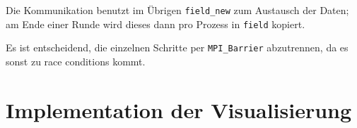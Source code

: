\begin{Shaded}
\begin{Highlighting}[]
            \NormalTok{blocklengths[}\NormalTok{] = \{}\NormalTok{,}\NormalTok{,}\NormalTok{,}\NormalTok{,}\NormalTok{\};                                  \textbackslash{}}
  \NormalTok{MPI_Datatype types[}\NormalTok{] = \{MPI_INT,MPI_INT,MPI_INT, MPI_INT, MPI_INT\};               \textbackslash{}}
  \NormalTok{MPI_Aint     offsets[}\NormalTok{];                                                   \textbackslash{}}
  \NormalTok{offsets[}\NormalTok{] = offsetof(Idea, a);                                            \textbackslash{}}
  \NormalTok{offsets[}\NormalTok{] = offsetof(Idea, b);                                            \textbackslash{}}
  \NormalTok{offsets[}\NormalTok{] = offsetof(Idea, c);                                            \textbackslash{}}
  \NormalTok{offsets[}\NormalTok{] = offsetof(Idea, h);                                            \textbackslash{}}
  \NormalTok{offsets[}\NormalTok{] = offsetof(Idea, empty);                                        \textbackslash{}}
\end{Highlighting}
\end{Shaded}

Die Kommunikation benutzt im Übrigen \texttt{field\_new} zum Austausch
der Daten; am Ende einer Runde wird dieses dann pro Prozess in
\texttt{field} kopiert.

Es ist entscheidend, die einzelnen Schritte per \texttt{MPI\_Barrier}
abzutrennen, da es sonst zu race conditions kommt.

\section{Implementation der
Visualisierung}\label{implementation-der-visualisierung}

